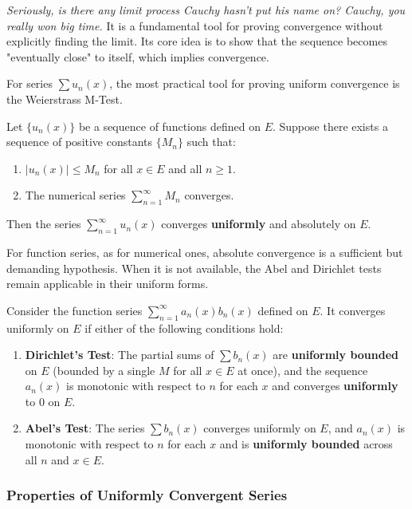 \textit{Seriously, is there any limit process Cauchy hasn't put his name on? Cauchy, you really won big time.} It is a fundamental tool for proving convergence without explicitly finding the limit. Its core idea is to show that the sequence becomes "eventually close" to itself, which implies convergence.

For series $\sum u_n(x)$, the most practical tool for proving uniform convergence is the Weierstrass M-Test.

\begin{theorem}
Let $\{u_n(x)\}$ be a sequence of functions defined on $E$. Suppose there exists a sequence of positive constants $\{M_n\}$ such that:
\begin{enumerate}
    \item $|u_n(x)| \le M_n$ for all $x \in E$ and all $n \ge 1$.
    \item The numerical series $\sum_{n=1}^{\infty} M_n$ converges.
\end{enumerate}
Then the series $\sum_{n=1}^{\infty} u_n(x)$ converges \textbf{uniformly} and absolutely on $E$.
\end{theorem}

For function series, as for numerical ones, absolute convergence is a sufficient but demanding hypothesis. When it is not available, the Abel and Dirichlet tests remain applicable in their uniform forms.

\begin{theorem}
Consider the function series $\sum_{n=1}^{\infty} a_n(x) b_n(x)$ defined on $E$. It converges uniformly on $E$ if either of the following conditions hold:
\begin{enumerate}
    \item \textbf{Dirichlet's Test}: The partial sums of $\sum b_n(x)$ are \textbf{uniformly bounded} on $E$ (bounded by a single $M$ for all $x \in E$ at once), and the sequence $a_n(x)$ is monotonic with respect to $n$ for each $x$ and converges \textbf{uniformly} to $0$ on $E$.
    \item \textbf{Abel's Test}: The series $\sum b_n(x)$ converges uniformly on $E$, and $a_n(x)$ is monotonic with respect to $n$ for each $x$ and is \textbf{uniformly bounded} across all $n$ and $x \in E$.
\end{enumerate}
\end{theorem}


\subsubsection{Properties of Uniformly Convergent Series}

